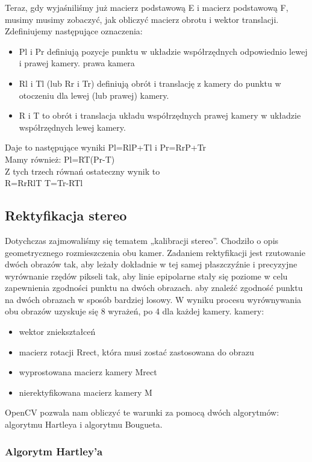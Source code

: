 \documentclass[magisterska]{pracadypl}
\begin{document}
Teraz, gdy wyjaśniliśmy już macierz podstawową E i macierz podstawową F, musimy
musimy zobaczyć, jak obliczyć macierz obrotu i wektor translacji.
Zdefiniujemy następujące oznaczenia:

\begin{itemize}
  \item Pl i Pr definiują pozycje punktu w układzie współrzędnych odpowiednio lewej i prawej kamery.
prawa kamera
  \item Rl i Tl (lub Rr i Tr) definiują obrót i translację z kamery
do punktu w otoczeniu dla lewej (lub prawej) kamery.
  \item R i T to obrót i translacja układu współrzędnych prawej kamery w układzie współrzędnych lewej kamery.
\end{itemize}

Daje to następujące wyniki
Pl=RlP+Tl i Pr=RrP+Tr\\
Mamy również:
Pl=RT(Pr-T)\\
Z tych trzech równań ostateczny wynik to\\
R=RrRlT
T=Tr-RTl

\subsection{Rektyfikacja stereo}

Dotychczas zajmowaliśmy się tematem „kalibracji stereo”. Chodziło o
opis geometrycznego rozmieszczenia obu kamer. Zadaniem
rektyfikacji jest rzutowanie dwóch obrazów tak, aby leżały dokładnie w tej samej płaszczyźnie i precyzyjne wyrównanie rzędów pikseli tak, aby linie epipolarne stały się poziome w celu zapewnienia zgodności punktu na dwóch obrazach.
aby znaleźć zgodność punktu na dwóch obrazach w sposób bardziej losowy.
W wyniku procesu wyrównywania obu obrazów uzyskuje się 8 wyrażeń, po 4 dla każdej kamery.
kamery:

\begin{itemize}
  \item wektor zniekształceń
  \item macierz rotacji Rrect, która musi zostać zastosowana do obrazu
  \item wyprostowana macierz kamery Mrect
  \item nierektyfikowana macierz kamery M
\end{itemize}

OpenCV pozwala nam obliczyć te warunki za pomocą dwóch algorytmów: algorytmu Hartleya
i algorytmu Bougueta.

\subsubsection{Algorytm Hartley'a}
\end{document}
